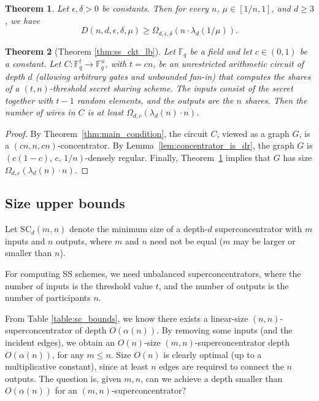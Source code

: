 \documentclass[11pt]{article}
\newtheorem{theorem}{Theorem}
\newcommand{\scsize}{\mathrm{SC}}
\begin{document}
\begin{theorem} 
\label{thm:pudlak_dr_lb}
\cite{Pud94} Let $\epsilon, \delta > 0$ be constants. Then for every $n$, $\mu \in [1/n, 1]$, and $d \ge 3$, we have
\[
D(n, d, \epsilon, \delta, \mu) \ge \Omega_{d, \epsilon, \delta}(n \cdot \lambda_d(1/\mu)).
\]
\end{theorem}

\begin{theorem} [Theorem \ref{thm:ss_ckt_lb}]
Let \(\mathbb{F}_q\) be a field and let \(c \in (0,1)\) be a constant.
Let \(C : \mathbb{F}_q^{t} \to \mathbb{F}_q^{n}\), with \(t = cn\), be an
unrestricted arithmetic circuit of depth \(d\) (allowing arbitrary gates
and unbounded fan-in) that computes the shares of a \((t,n)\)-threshold
secret sharing scheme. The inputs consist of the secret together with
\(t-1\) random elements, and the outputs are the \(n\) shares.
Then the number of wires in \(C\) is at least $\Omega_{d, c}\!\left(\lambda_d(n)\cdot n\right)$.
\end{theorem}
\begin{proof} 
By Theorem~\ref{thm:main_condition}, the circuit \(C\), viewed as a graph \(G\),
is a \((cn,n,cn)\)-concentrator. By Lemma~\ref{lem:concentrator_is_dr},
the graph \(G\) is \((c(1-c),\,c,\,1/n)\)-densely regular. Finally,
Theorem~\ref{thm:pudlak_dr_lb} implies that \(G\) has size
\(\Omega_{d,c}\!\left(\lambda_d(n)\cdot n\right)\).
\end{proof}


\subsection{Size upper bounds}

Let $\scsize_d(m,n)$ denote the minimum size of a depth-$d$ superconcentrator with $m$ inputs and $n$ outputs, where $m$ and $n$ need not be equal ($m$ may be larger or smaller than $n$).

For computing SS schemes, we need unbalanced superconcentrators, where the number of inputs is the threshold value $t$, and the number of outputs is the number of participants $n$.

From Table \ref{table:sc_bounds}, we know there exists a linear-size $(n, n)$-superconcentrator of depth $O(\alpha(n))$. By removing some inputs (and the incident edges), we obtain an $O(n)$-size $(m, n)$-superconcentrator depth $O(\alpha(n))$, for any $m \le n$. Size $O(n)$ is clearly optimal (up to a multiplicative constant), since at least $n$ edges are required to connect the $n$ outputs. The question is, given $m, n$, can we achieve a depth smaller than $O(\alpha(n))$ for an $(m,n)$-superconcentrator?
\end{document}
